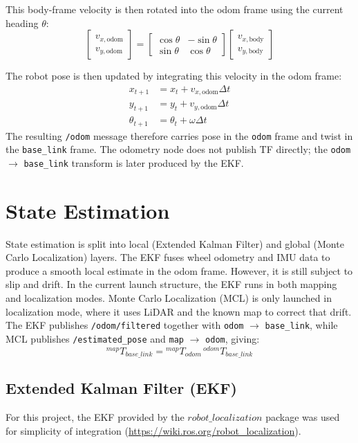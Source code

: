 \documentclass[11pt]{article}
\begin{document}
This body-frame velocity is then rotated into the odom frame using the current heading $\theta$:
\begin{equation*}
\begin{bmatrix}
v_{x,\mathrm{odom}} \\
v_{y,\mathrm{odom}}
\end{bmatrix}
=
\begin{bmatrix}
\cos\theta & -\sin\theta \\
\sin\theta & \cos\theta
\end{bmatrix}
\begin{bmatrix}
v_{x,\mathrm{body}} \\
v_{y,\mathrm{body}}
\end{bmatrix}
\end{equation*}

The robot pose is then updated by integrating this velocity in the odom frame:
\begin{align*}
x_{t+1} &= x_t + v_{x,\mathrm{odom}}\Delta t \\
y_{t+1} &= y_t + v_{y,\mathrm{odom}}\Delta t \\
\theta_{t+1} &= \theta_t + \omega \Delta t
\end{align*}
\noindent The resulting \texttt{/odom} message therefore carries pose in the
\texttt{odom} frame and twist in the \texttt{base\_link} frame. The odometry
node does not publish TF directly; the \texttt{odom} $\to$ \texttt{base\_link}
transform is later produced by the EKF.


\section{State Estimation}
State estimation is split into local (Extended Kalman Filter) and global (Monte Carlo Localization) layers.
The EKF fuses wheel odometry and IMU data to produce a smooth local estimate in the odom frame. However, it is still
subject to slip and drift. In the current launch structure, the EKF runs in both mapping and localization modes. Monte
Carlo Localization (MCL) is only launched in localization mode, where it uses LiDAR and the known map to correct that
drift.
The EKF publishes \texttt{/odom/filtered} together with \texttt{odom} $\to$ \texttt{base\_link}, while MCL publishes
\texttt{/estimated\_pose} and \texttt{map} $\to$ \texttt{odom}, giving:
\[
{}^{map}\!T_{base\_link} = {}^{map}\!T_{odom}\,{}^{odom}\!T_{base\_link}
\]

\subsection{Extended Kalman Filter (EKF)}
For this project, the EKF provided by the $robot\_localization$ package was used for simplicity of integration
(\url{https://wiki.ros.org/robot_localization}).
\end{document}
